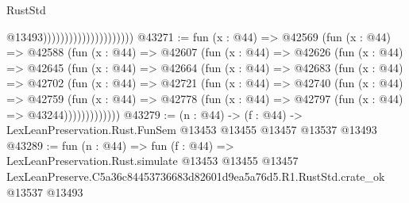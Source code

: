 \begin{lexlean}{RustStd}
\begin{coremodule}
                                              @13493)))))))))))))))))))))
@43271 := fun (x : @44) =>
  @42569
    (fun (x : @44) =>
    @42588
      (fun (x : @44) =>
      @42607
        (fun (x : @44) =>
        @42626
          (fun (x : @44) =>
          @42645
            (fun (x : @44) =>
            @42664
              (fun (x : @44) =>
              @42683
                (fun (x : @44) =>
                @42702
                  (fun (x : @44) =>
                  @42721
                    (fun (x : @44) =>
                    @42740
                      (fun (x : @44) =>
                      @42759
                        (fun (x : @44) =>
                        @42778 (fun (x : @44) => @42797 (fun (x : @44) => @43244)))))))))))))
@43279 := (n : @44) ->
  (f : @44) -> LexLeanPreservation.Rust.FunSem @13453 @13455 @13457 @13537 @13493
@43289 := fun (n : @44) =>
  fun (f : @44) =>
  LexLeanPreservation.Rust.simulate
    @13453
    @13455
    @13457
    LexLeanPreserve.C5a36c84453736683d82601d9ea5a76d5.R1.RustStd.crate_ok
    @13537
    @13493
\end{coremodule}
\end{lexlean}
